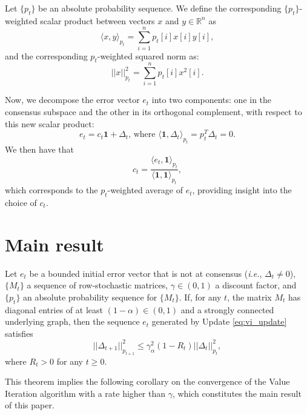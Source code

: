 \documentclass{article}
\begin{document}
\begin{definition}
Let $\{p_t \}$ be an absolute probability sequence. We define the corresponding $\{p_t \}$-weighted scalar product between vectors $x$ and $y \in \mathbb{R}^n$ as
\begin{equation*}
\langle x,y \rangle_{p_t} = \sum_{i=1}^n p_t[i]x[i]y[i],
\end{equation*}
and the corresponding $p_t$-weighted squared norm as:
\begin{equation*}
||x||^2_{p_t} = \sum_{i=1}^n p_t[i] x^2[i].
\end{equation*}
\end{definition}

Now, we decompose the error vector $e_t$ into two components: one in the consensus subspace and the other in its orthogonal complement, with respect to this new scalar product:
\begin{equation} \label{eq:decomposition}
e_t = c_t \mathbf{1} + \Delta_t,\, \text{where } \langle \mathbf{1}, \Delta_t \rangle_{p_t} =
p_t^T\Delta_t = 0.
\end{equation}
We then have that
\begin{equation*}
c_t = \frac{ \langle e_t, \mathbf{1} \rangle_{p_t}}{ \langle \mathbf{1}, \mathbf{1} \rangle_{p_t}},
\end{equation*}
which corresponds to the $p_t$-weighted average of $e_t$, providing insight into the choice of $c_t$.

\section{Main result}

\begin{theorem} \label{thm:main}
Let $e_t$ be a bounded initial error vector that is not at consensus (\textit{i.e.}, $\Delta_t \ne 0$), $\{M_t\}$ a sequence of row-stochastic matrices, $\gamma \in (0,1)$ a discount factor, and $\{p_t\}$ an absolute probability sequence for $\{M_t\}$. If, for any $t$, the matrix $M_t$ has diagonal entries of at least $(1-\alpha) \in (0,1)$ and a strongly connected underlying graph, then the sequence $e_t$ generated by Update \ref{eq:vi_update} satisfies
\begin{equation}
|| \Delta_{t+1}||_{p_{t+1}}^2 \leq \gamma_\alpha^2(1-R_t)|| \Delta_{t}||_{p_t}^2,
\end{equation}
where $R_t > 0$ for any $t \geq 0$.
\end{theorem}

This theorem implies the following corollary on the convergence of the Value Iteration algorithm with a rate higher than $\gamma$, which constitutes the main result of this paper.
\end{document}
